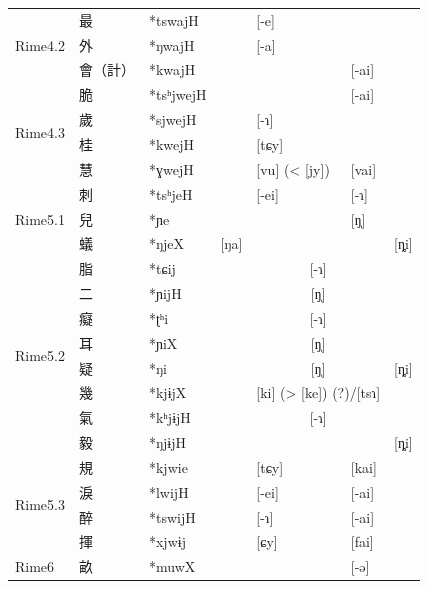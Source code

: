 \documentclass{scrbook}
\newcounter{c}[subsubsection]
\begin{document}
\begin{sloppypar}
\begin{landscape}
\begin{longtable}[htbp]{lllllll}
    \midrule
    \multirow{3}[2]{*}{Rime4.2} & 最     & *tswajH &       & [-e]  &       &  \\
          & 外     & *ŋwajH &       & [-a]  &       &  \\
          & 會（計）  & *kwajH &       &       & [-ai] &  \\
    \midrule
    \multirow{4}[2]{*}{Rime4.3} & 脆     & *tsʰjwejH &       &       & [-ai] &  \\
          & 歲     & *sjwejH &       & [-ɿ]  &       &  \\
          & 桂     & *kwejH &       & [tɕy] &       &  \\
          & 慧     & *ɣwejH &       & [vu] (< [jy]) & [vai] &  \\
    \midrule
    \multirow{3}[2]{*}{Rime5.1} & 刺     & *tsʰjeH &       & [-ei] & [-ɿ]  &  \\
          & 兒     & *ɲe   &       &       & [ŋ̩]  &  \\
          & 蟻     & *ŋjeX & \multicolumn{1}{l}{[ŋa]} &       &       & \multicolumn{1}{l}{[ȵi]} \\
    \midrule
    \multirow{8}[2]{*}{Rime5.2} & 脂     & *tɕij &       & \multicolumn{2}{c}{[-ɿ]} &  \\
          & 二     & *ɲijH &       & \multicolumn{2}{c}{[ŋ̩]} &  \\
          & 癡     & *ʈʰi  &       & \multicolumn{2}{c}{[-ɿ]} &  \\
          & 耳     & *ɲiX  &       & \multicolumn{2}{c}{[ŋ̩]} &  \\
          & 疑     & *ŋi   &       & \multicolumn{2}{c}{[ŋ̩]} & \multicolumn{1}{l}{[ȵi]} \\
          & 幾     & *kjɨjX &       & \multicolumn{2}{c}{[ki] (> [ke]) (?)/[tsɿ]} &  \\
          & 氣     & *kʰjɨjH &       & \multicolumn{2}{c}{[-ɿ]} &  \\
          & 毅     & *ŋjɨjH &       & \multicolumn{2}{c}{} & \multicolumn{1}{l}{[ȵi]} \\
    \midrule
    \multirow{4}[2]{*}{Rime5.3} & 規     & *kjwie &       & [tɕy] & [kai] &  \\
          & 淚     & *lwijH &       & [-ei] & [-ai] &  \\
          & 醉     & *tswijH &       & [-ɿ]  & [-ai] &  \\
          & 揮     & *xjwɨj &       & [ɕy]  & [fai] &  \\
    \midrule
    \multirow{6}[2]{*}{Rime6} & 畝     & *muwX &       &       & [-ə]  &  \\

\end{longtable}
\end{landscape}
\end{sloppypar}
\end{document}
